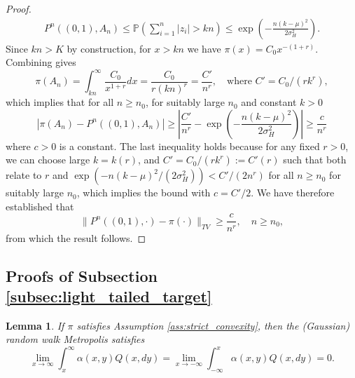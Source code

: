 \documentclass{article}
\theoremstyle{definition}
\theoremstyle{plain}
\newtheorem{lemma}[definition]{Lemma}
\begin{document}
\begin{proof}
\begin{align}
    P^n((0,1),A_n) \le  \mathbb{P}\left(\sum_{i=1}^n|z_i| >kn\right)\le \exp\left(-\frac{n(k-\mu)^2}{2\sigma_H^2}\right).
\end{align}
Since $kn>K$ by construction, for $x>kn$ we have $\pi(x) = C_0 x^{-(1+r)}$. Combining gives
\begin{equation}
    \pi(A_n) = \int_{kn}^\infty \frac{C_0}{x^{1+r}}  dx = \frac{C_0}{r(kn)^r} = \frac{C'}{n^r}, \quad \text{where } C' = C_0/(rk^r),
\end{equation}  
which implies that for all $n\ge n_0$, for suitably large $n_0$ and constant $k>0$
\begin{equation}
    |\pi(A_n) - P^n((0,1),A_n)| \ge \left|\frac{C'}{n^r} - \exp\left(-\frac{n(k-\mu)^2}{2\sigma_H^2}\right)\right| \ge \frac{c}{n^r}
\end{equation}
where $c>0$ is a constant. The last inequality holds because for any fixed $r>0$, we can choose large $k=k(r)$, and $C' = C_0/(rk^r):= C'(r)$ such that both relate to $r$ and $\exp(-n(k-\mu)^2/(2\sigma_H^2)) < C'/(2n^r)$ for all $n\ge n_0$ for suitably large $n_0$, which implies the bound with $c = C'/2$.  We have therefore established that
\begin{equation}
    \|P^n((0,1),\cdot) - \pi(\cdot)\|_{TV} \ge \frac{c}{n^r}, \quad n\ge n_0,
\end{equation}
from which the result follows.
\end{proof}


\subsection{Proofs of Subsection \ref{subsec:light_tailed_target}}
\label{app:proofs_gwm_lighttails}

\begin{lemma}
\label{lem:convergence_alpha_light_tails}
If $\pi$ satisfies Assumption \ref{ass:strict_convexity}, then the (Gaussian) random walk Metropolis satisfies
\begin{equation*}
    \lim_{x\to \infty}\int_{x}^{\infty} \alpha(x,y)Q(x,dy) = \lim_{x\to -\infty}\int_{-\infty}^{x} \alpha(x,y)Q(x,dy) = 0.
\end{equation*}
\end{lemma}
\end{document}
